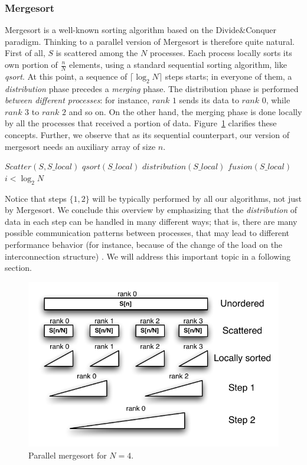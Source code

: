 \subsubsection{Mergesort}
Mergesort is a well-known sorting algorithm based on the Divide$\&$Conquer paradigm. Thinking to a parallel version of Mergesort is therefore quite natural. First of all, $S$ is scattered among the $N$ processes. Each process locally sorts its own portion of $\frac{n}{N}$ elements, using a standard sequential sorting algorithm, like \textit{qsort}. At this point, a sequence of $\lceil \log_{2}{N} \rceil$ steps starts; in everyone of them, a \textit{distribution} phase precedes a \textit{merging} phase. The distribution phase is performed \textit{between different processes}: for instance, $rank$ $1$ sends its data to $rank$ $0$, while $rank$ $3$ to $rank$ $2$ and so on. On the other hand, the merging phase is done locally by all the processes that received a portion of data. Figure~\ref{merge-dist} clarifies these concepts. Further, we observe that as its sequential counterpart, our version of mergesort needs an auxiliary array of size $n$. 
\begin{algorithmic}[1]  
	\medskip
	\STATE $Scatter( S, S\_local )$
	\STATE $qsort( S\_local )$
	\REPEAT 
		\STATE $distribution( S\_local )$
		\STATE $fusion ( S\_local )$
	\UNTIL $i < \log_{2}{N}$
	\medskip
\label{alg1}
\end{algorithmic}
Notice that steps $\lbrace 1, 2 \rbrace$ will be typically performed by all our algorithms, not just by Mergesort. We conclude this overview by emphasizing that the \textit{distribution} of data in each step can be handled in many different ways; that is, there are many possible communication patterns between processes, that may lead to different performance behavior (for instance, because of the change of the load on the interconnection structure) . We will address this important topic in a following section.

\begin{figure}[h]
        \centerline{
               \mbox{\includegraphics[scale=0.70]{mergesort-pict1}}
        }
        \caption{Parallel mergesort for $N = 4$.}
        \label{merge-dist}
\end{figure}


